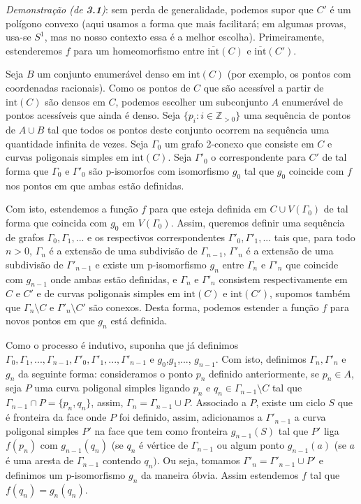 \documentclass[12pt,a4paper]{article}
\theoremstyle{definition}
\begin{document}
\textit{Demonstração (de \textbf{3.1})}: sem perda de generalidade, podemos supor que $C'$ é um polígono convexo (aqui usamos a forma que mais facilitará; em algumas provas, usa-se $S^1$, mas no nosso contexto essa é a melhor escolha). Primeiramente, estenderemos $f$ para um homeomorfismo entre $\overline{\text{int}}(C)$ e $\overline{\text{int}}(C')$. 
 
Seja $B$ um conjunto enumerável denso em $\text{int}(C)$ (por exemplo, os pontos com coordenadas racionais). Como os pontos de $C$ que são acessível a partir de $\text{int}(C)$ são densos em $C$, podemos escolher um subconjunto $A$ enumerável de pontos acessíveis que ainda é denso. Seja $\{p_i : i\in \mathbb{Z}_{>0}\}$  uma sequência de pontos de $A\cup B$ tal que todos os pontos deste conjunto ocorrem na sequência uma quantidade infinita de vezes. Seja $\Gamma_0$ um grafo 2-conexo que consiste em $C$ e curvas poligonais simples em $\text{int}(C)$. Seja $\Gamma'_0$ o correspondente para $C'$ de tal forma que $\Gamma_0$ e $\Gamma'_0$ são p-isomorfos com isomorfismo $g_0$ tal que $g_0$ coincide com $f$ nos pontos em que ambas estão definidas. 
 
Com isto, estendemos a função $f$ para que esteja definida em $C\cup V(\Gamma_0)$ de tal forma que coincida com $g_0$ em $V(\Gamma_0)$. Assim, queremos definir uma sequência de grafos $\Gamma_0, \Gamma_1 , ...$ e os respectivos correspondentes $\Gamma'_0, \Gamma'_1 , ...$ tais que, para todo $n>0$, $\Gamma_n$ é a extensão de uma subdivisão de $\Gamma_{n-1}$, $\Gamma'_n$ é a extensão de uma subdivisão de $\Gamma'_{n-1}$ e existe um p-isomorfismo $g_n$ entre $\Gamma_n$ e $\Gamma'_n$ que coincide com $g_{n-1}$ onde ambas estão definidas, e $\Gamma_n$ e $\Gamma'_n$ consistem respectivamente em $C$ e $C'$ e de curvas poligonais simples em $\text{int}(C)$ e $\text{int}(C')$, supomos também que $\Gamma_n\setminus C$ e  $\Gamma'_n\setminus C'$ são conexos. Desta forma, podemos estender a função $f$ para novos pontos em que $g_n$ está definida.
 
Como o processo é indutivo, suponha que já definimos $\Gamma_0, \Gamma_1,..., \Gamma_{n-1},\Gamma'_0, \Gamma'_1,..., \Gamma'_{n-1}$ e  $g_0$,$g_1$,$...$, $g_{n-1}$. Com isto, definimos $\Gamma_n,\Gamma'_n$ e $g_n$ da seguinte forma: consideramos o ponto $p_n$ definido anteriormente, se $p_n\in A$, seja $P$ uma curva poligonal simples ligando $p_n$ e $q_n\in \Gamma_{n-1}\setminus C$ tal que $ \Gamma_{n-1}\cap P = \{ p_n, q_n\}$, assim, $\Gamma_n = \Gamma_{n-1}\cup P$. Associado a $P$, existe um ciclo $S$ que é fronteira da face onde $P$ foi definido, assim, adicionamos a $\Gamma'_{n-1}$ a curva poligonal simples $P'$ na face que tem como fronteira $g_{n-1}(S)$ tal que $P'$ liga $f(p_n)$ com $g_{n-1}(q_n)$ (se $q_n$ é vértice de $\Gamma_{n-1}$ ou algum ponto $g_{n-1}(a)$ (se $a$ é uma aresta de $\Gamma_{n-1}$ contendo $q_n)$. Ou seja, tomamos $\Gamma'_n=\Gamma'_{n-1}\cup P'$ e definimos um p-isomorfismo $g_n$ da maneira óbvia. Assim estendemos $f$ tal que $f(q_n)=g_n(q_n)$. 
 
\end{document}
